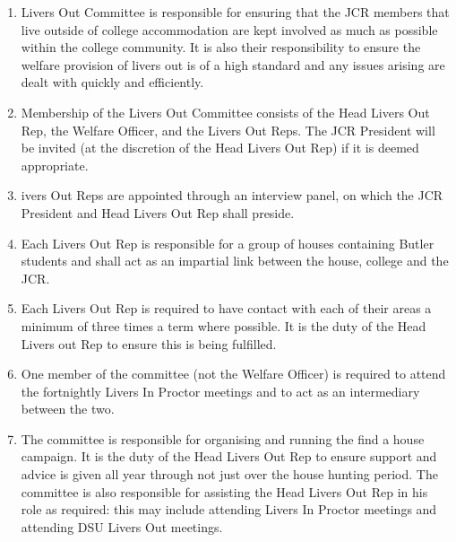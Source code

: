 
\begin{enumerate}
    \item Livers Out Committee is responsible for ensuring that the JCR members that live outside of college accommodation are kept involved as much as possible within the college community. It is also their responsibility to ensure the welfare provision of livers out is of a high standard and any issues arising are dealt with quickly and efficiently.
    \item Membership of the Livers Out Committee consists of the Head Livers Out Rep, the Welfare Officer, and the Livers Out Reps. The JCR President will be invited (at the discretion of the Head Livers Out Rep) if it is deemed appropriate.
    \item ivers Out Reps are appointed through an interview panel, on which the JCR President and Head Livers Out Rep shall preside.
    \item Each Livers Out Rep is responsible for a group of houses containing Butler students and shall act as an impartial link between the house, college and the JCR.
    \item Each Livers Out Rep is required to have contact with each of their areas a minimum of three times a term where possible. It is the duty of the Head Livers out Rep to ensure this is being fulfilled.
    \item One member of the committee (not the Welfare Officer) is required to attend the fortnightly Livers In Proctor meetings and to act as an intermediary between the two.
    \item The committee is responsible for organising and running the find a house campaign. It is the duty of the Head Livers Out Rep to ensure support and advice is given all year through not just over the house hunting period. The committee is also responsible for assisting the Head Livers Out Rep in his role as required: this may include attending Livers In Proctor meetings and attending DSU Livers Out meetings.
\end{enumerate}




